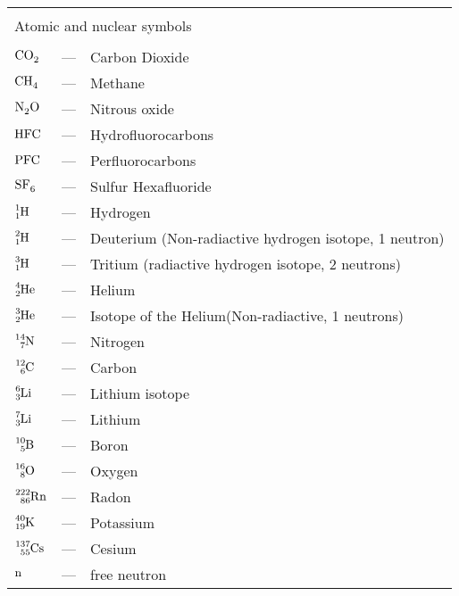 \begin{longtable}{p{25mm} c p{120mm} }
\\
\\
\multicolumn{3}{l}{Atomic and nuclear symbols}\\
\\
$\ce{CO_2}$ & --- & Carbon Dioxide\\
$\ce{CH_4}$ & --- & Methane\\
$\ce{N_2 O}$ & --- & Nitrous oxide\\
$\ce{HFC}$ & --- & Hydrofluorocarbons\\
$\ce{PFC}$ & --- & Perfluorocarbons\\
$\ce{SF_6}$ & --- & Sulfur Hexafluoride\\
$\ce{^{1}_{1}H}$ & --- & Hydrogen\\
$\ce{^{2}_{1}H}$ & --- & Deuterium (Non-radiactive hydrogen isotope, 1 neutron)\\
$\ce{^{3}_{1}H}$ & --- & Tritium (radiactive hydrogen isotope, 2 neutrons)\\
$\ce{^{4}_{2}He}$ & --- & Helium\\
$\ce{^{3}_{2}He}$ & --- & Isotope of the Helium(Non-radiactive, 1 neutrons)\\
$\ce{^{14}_{7}N}$ & --- & Nitrogen\\
$\ce{^{12}_{6}C}$ & --- & Carbon\\
$\ce{^{6}_{3}Li}$ & --- & Lithium isotope\\
$\ce{^{7}_{3}Li}$ & --- & Lithium\\
$\ce{^{10}_{5}B}$ & --- & Boron\\
$\ce{^{16}_{8}O}$ & --- & Oxygen\\
$\ce{^{222}_{86}Rn}$ & --- & Radon\\
$\ce{^{40}_{19}K}$ & --- & Potassium\\
$\ce{^{137}_{55}Cs}$ & --- & Cesium\\
$\ce{n}$ & --- & free neutron\\

\end{longtable}
